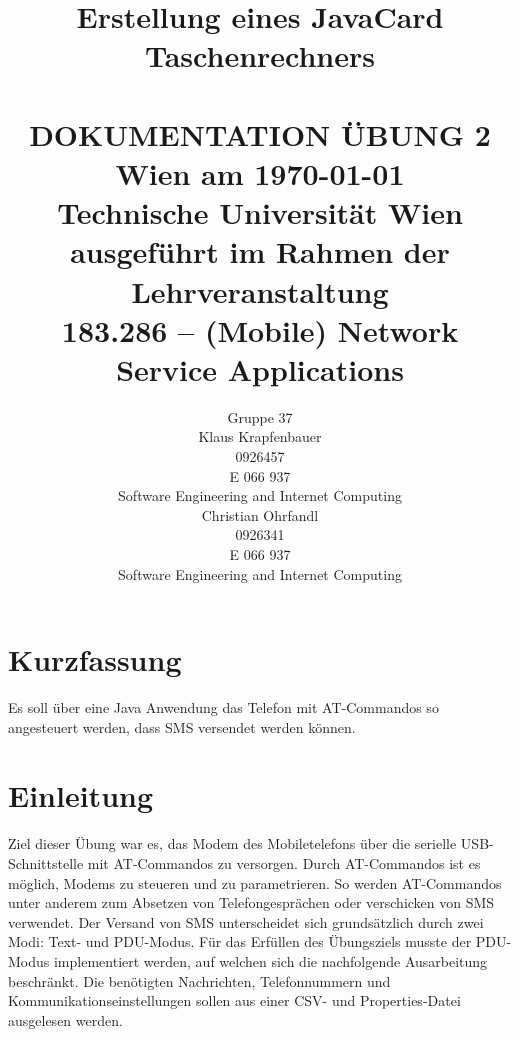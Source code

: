 \documentclass[paper=a4, fontsize=11pt]{scrartcl}
\title{	\normalsize Erstellung eines JavaCard Taschenrechners%
	\\[2.0cm] \HRule{0.5pt} \\
	\LARGE \textbf{\uppercase{Dokumentation Übung 2}} %
	\HRule{2pt} \\[1.5cm]
	\normalsize Wien am \today \\
	\normalsize Technische Universität Wien \\[1.0cm]
	\normalsize ausgeführt im Rahmen der Lehrveranstaltung \\
	\LARGE 183.286 – (Mobile) Network Service Applications
}
\author{
	Gruppe 37 \\[2.0cm]
	Klaus Krapfenbauer \\
	0926457 \\
	E 066 937 \\
	Software Engineering and Internet Computing \\[2.0cm]
	Christian Ohrfandl \\
	0926341 \\
	E 066 937 \\
	Software Engineering and Internet Computing \\[2.0cm]
}
\makeatletter
\def\printtitle{%
	{\centering \@title\par}}
\def\printauthor{%
	{\centering \normalsize \@author}}
\makeatother
\begin{document}
\thispagestyle{empty} %
\printtitle
	\vfill
\printauthor

\newpage
\tableofcontents

\newpage

\section{Kurzfassung}
Es soll über eine Java Anwendung das Telefon mit AT-Commandos so angesteuert werden, dass SMS versendet werden können.

\section{Einleitung}
Ziel dieser Übung war es, das Modem  des Mobiletelefons über die serielle USB-Schnittstelle mit AT-Commandos zu versorgen. Durch AT-Commandos ist es möglich, Modems zu steueren und zu parametrieren. So werden AT-Commandos unter anderem zum Absetzen von Telefongesprächen oder verschicken von SMS verwendet. Der Versand von SMS unterscheidet sich grundsätzlich durch zwei Modi: Text- und PDU-Modus. Für das Erfüllen des Übungsziels musste der PDU-Modus implementiert werden, auf welchen sich die nachfolgende Ausarbeitung beschränkt. Die benötigten Nachrichten, Telefonnummern und Kommunikationseinstellungen sollen aus einer CSV- und Properties-Datei ausgelesen werden.
\end{document}
